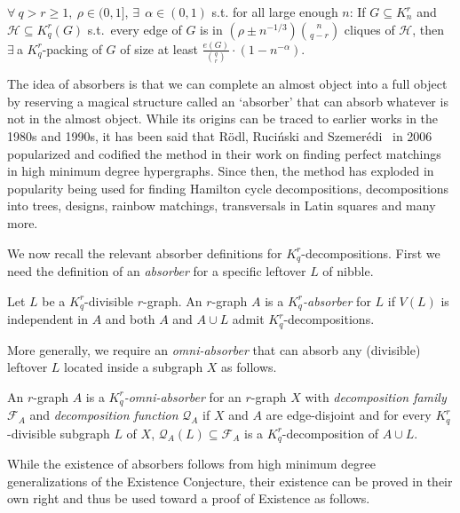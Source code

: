\documentclass[twoside,leqno]{article}
\begin{document}
\begin{corollary}\label{cor:NibbleDesignsSpecific}
$\forall~q > r\ge 1,~\rho \in (0,1]$, $\exists~~\alpha\in (0,1)$ s.t. for all large enough $n$: If $G\subseteq K_n^r$ and $\mathcal{H}\subseteq K_q^r(G)$ s.t.~every edge of $G$ is in $\left(\rho \pm n^{-1/3}\right) \binom{n}{q-r}$ cliques of $\mathcal{H}$, then $\exists~$a $K_q^r$-packing of $G$ of size at least $\frac{e(G)}{\binom{q}{r}} \cdot \left(1-n^{-\alpha}\right)$. 
\end{corollary}

The idea of absorbers is that we can complete an almost object into a full object by reserving a magical structure called an `absorber' that can absorb whatever is not in the almost object. While its origins can be traced to earlier works in the 1980s and 1990s, it has been said that R\"odl, Ruci\'nski and Szemer\'edi~\cite{RRS06} in 2006 popularized and codified the method in their work on finding perfect matchings in high minimum degree hypergraphs. Since then, the method has exploded in popularity being used for finding Hamilton cycle decompositions, decompositions into trees, designs, rainbow matchings, transversals in Latin squares and many more. 

We now recall the relevant absorber definitions for $K_q^r$-decompositions. First we need the definition of an \emph{absorber} for a specific leftover $L$ of nibble.

\begin{definition}[Absorber] Let $L$ be a $K_q^r$-divisible $r$-graph.  An $r$-graph $A$ is a \emph{$K_q^r$-absorber} for $L$ if $V(L)$ is independent in $A$ and both $A$ and $A\cup L$ admit $K_q^r$-decompositions.    
\end{definition}

More generally, we require an \emph{omni-absorber} that can absorb any (divisible) leftover $L$ located inside a subgraph $X$ as follows.

\begin{definition}\label{def:OmniAbsorbers}
An $r$-graph $A$ is a \emph{$K_q^r$-omni-absorber} for an $r$-graph $X$ with \emph{decomposition family} $\mathcal{F}_A$ and \emph{decomposition function} $\mathcal{Q}_A$  if $X$ and $A$ are edge-disjoint and for every $K_q^r$-divisible subgraph $L$ of $X$, $\mathcal{Q}_A(L)\subseteq \mathcal{F}_A$ is a $K_q^r$-decomposition of $A\cup L$. 
\end{definition}

While the existence of absorbers follows from high minimum degree generalizations of the Existence Conjecture, their existence can be proved in their own right and thus be used toward a proof of Existence as follows.
\end{document}
